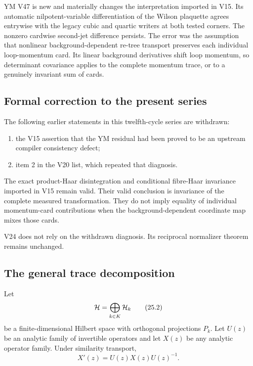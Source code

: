 \documentclass[11pt]{article}
\theoremstyle{remark}
\begin{document}
YM V47 is new and materially changes the interpretation imported in
V15.  Its automatic nilpotent-variable differentiation of the
Wilson plaquette agrees entrywise with the legacy cubic and quartic
writers at both tested corners.  The nonzero cardwise second-jet
difference persists.  The error was the assumption that nonlinear
background-dependent re-tree transport preserves each individual
loop-momentum card.  Its linear background derivatives shift loop
momentum, so determinant covariance applies to the complete momentum
trace, or to a genuinely invariant sum of cards.

\subsection{Formal correction to the present series}

\begin{correction}
\label{corr:v12v25-compiler}
The following earlier statements in this twelfth-cycle series are
withdrawn:

\begin{enumerate}
\item the V15 assertion that the YM residual had been proved to be an
      upstream compiler consistency defect;
\item item 2 in the V20 list, which repeated that diagnosis.
\end{enumerate}

The exact product-Haar disintegration and conditional fibre-Haar
invariance imported in V15 remain valid.  Their valid conclusion is
invariance of the complete measured transformation.  They do not
imply equality of individual momentum-card contributions when the
background-dependent coordinate map mixes those cards.

V24 does not rely on the withdrawn diagnosis.  Its reciprocal
normalizer theorem remains unchanged.
\end{correction}

\subsection{The general trace decomposition}

Let
\[
                         {\cal H}=\bigoplus_{k\in K}{\cal H}_k
                                                               \tag{25.2}
\]
be a finite-dimensional Hilbert space with orthogonal projections
\(P_k\).  Let \(U(z)\) be an analytic family of invertible operators
and let \(X(z)\) be any analytic operator family.  Under similarity
transport,
\[
                         X'(z)=U(z)X(z)U(z)^{-1}.            \tag{25.3}
\]
\end{document}
